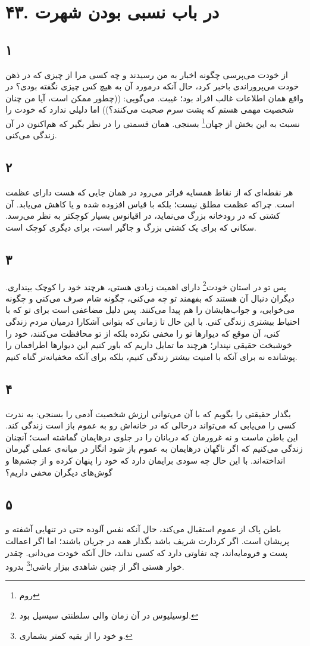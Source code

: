 \documentclass{article}
\author{github.com/parasilius/moral-letters-to-lucilius}
\begin{document}
\section*{۴۳. در باب نسبی بودن شهرت}
    \subsection*{۱}
    از خودت می‌پرسی چگونه اخبار به من رسیدند و چه کسی مرا از چیزی که در ذهن خودت می‌پروراندی باخبر کرد، حال آنکه درمورد آن به هیچ کس چیزی نگفته بودی؟
    در واقع همان اطلاعات غالب افراد بود؛ غیبت.
    می‌گویی: ((چطور ممکن است، آیا من چنان شخصیت مهمی هستم که پشت سرم صحبت می‌کنند؟))
    اما دلیلی ندارد که خودت را نسبت به این بخش از جهان\footnote{روم} بسنجی.
    همان قسمتی را در نظر بگیر که هم‌اکنون در آن زندگی می‌کنی.
    \subsection*{۲}
    هر نقطه‌ای که از نقاط همسایه فراتر می‌رود در همان جایی که هست دارای عظمت است.
    چراکه عظمت مطلق نیست؛
    بلکه با قیاس افزوده شده و یا کاهش می‌یابد.
    آن کشتی که در رودخانه بزرگ می‌نماید، در اقیانوس بسیار کوچکتر به نظر می‌رسد.
    سکانی که برای یک کشتی بزرگ و جاگیر است، برای دیگری کوچک است.
    \subsection*{۳}
    پس تو در استان خودت\footnote{لوسیلیوس در آن زمان والی سلطنتی سیسیل بود.} دارای اهمیت زیادی هستی، هرچند خود را کوچک بپنداری.
    دیگران دنبال آن هستند که بفهمند تو چه می‌کنی، چگونه شام صرف می‌کنی و چگونه می‌خوابی، و جواب‌هایشان را هم پیدا می‌کنند.
    پس دلیل مضاعفی است برای تو که با احتیاط بیشتری زندگی کنی.
    با این حال تا زمانی که بتوانی آشکارا درمیان مردم زندگی کنی، آن موقع که دیوارها تو را مخفی نکرده بلکه از تو محافظت می‌کنند، خود را خوشبخت حقیقی نپندار؛
    هرچند ما تمایل داریم که باور کنیم این دیوارها اطرافمان را پوشانده نه برای آنکه با امنیت بیشتر زندگی کنیم، بلکه برای آنکه مخفیانه‌تر گناه کنیم.
    \subsection*{۴}
    بگذار حقیقتی را بگویم که با آن می‌توانی ارزش شخصیت آدمی را بسنجی:
    به ندرت کسی را می‌یابی که می‌تواند درحالی که در خانه‌اش رو به عموم باز است زندگی کند.
    این باطن ماست و نه غرورمان که دربانان را در جلوی درهایمان گماشته است؛
    آنچنان زندگی می‌کنیم که اگر ناگهان درهایمان به عموم باز شود انگار در میانه‌ی عملی گیرمان انداخته‌اند.
    با این حال چه سودی برایمان دارد که خود را پنهان کرده و از چشم‌ها و گوش‌های دیگران مخفی داریم؟
    \subsection*{۵}
    باطن پاک از عموم استقبال می‌کند، حال آنکه نفس آلوده حتی در تنهایی آشفته و پریشان است.
    اگر کردارت شریف باشد بگذار همه در جریان باشند؛
    اما اگر اعمالت پست و فرومایه‌اند، چه تفاوتی دارد که کسی نداند، حال آنکه خودت می‌دانی.
    چقدر خوار هستی اگر از چنین شاهدی بیزار باشی!\footnote{و خود را از بقیه کمتر بشماری.}
    بدرود.
\end{document}
